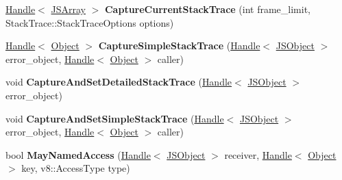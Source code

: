 \begin{DoxyCompactItemize}
\item 
\hypertarget{classv8_1_1internal_1_1_isolate_abb32dfbd23281a600e08a714c1b6e873}{}\hyperlink{classv8_1_1internal_1_1_handle}{Handle}$<$ \hyperlink{classv8_1_1internal_1_1_j_s_array}{J\+S\+Array} $>$ {\bfseries Capture\+Current\+Stack\+Trace} (int frame\+\_\+limit, Stack\+Trace\+::\+Stack\+Trace\+Options options)\label{classv8_1_1internal_1_1_isolate_abb32dfbd23281a600e08a714c1b6e873}

\item 
\hypertarget{classv8_1_1internal_1_1_isolate_a1f4a39027e00ddf0849c9c7e78663316}{}\hyperlink{classv8_1_1internal_1_1_handle}{Handle}$<$ \hyperlink{classv8_1_1internal_1_1_object}{Object} $>$ {\bfseries Capture\+Simple\+Stack\+Trace} (\hyperlink{classv8_1_1internal_1_1_handle}{Handle}$<$ \hyperlink{classv8_1_1internal_1_1_j_s_object}{J\+S\+Object} $>$ error\+\_\+object, \hyperlink{classv8_1_1internal_1_1_handle}{Handle}$<$ \hyperlink{classv8_1_1internal_1_1_object}{Object} $>$ caller)\label{classv8_1_1internal_1_1_isolate_a1f4a39027e00ddf0849c9c7e78663316}

\item 
\hypertarget{classv8_1_1internal_1_1_isolate_aa93e54d80774d9817a625e70a47e3609}{}void {\bfseries Capture\+And\+Set\+Detailed\+Stack\+Trace} (\hyperlink{classv8_1_1internal_1_1_handle}{Handle}$<$ \hyperlink{classv8_1_1internal_1_1_j_s_object}{J\+S\+Object} $>$ error\+\_\+object)\label{classv8_1_1internal_1_1_isolate_aa93e54d80774d9817a625e70a47e3609}

\item 
\hypertarget{classv8_1_1internal_1_1_isolate_a43f5575d84dd78fbbd347b3a247a616a}{}void {\bfseries Capture\+And\+Set\+Simple\+Stack\+Trace} (\hyperlink{classv8_1_1internal_1_1_handle}{Handle}$<$ \hyperlink{classv8_1_1internal_1_1_j_s_object}{J\+S\+Object} $>$ error\+\_\+object, \hyperlink{classv8_1_1internal_1_1_handle}{Handle}$<$ \hyperlink{classv8_1_1internal_1_1_object}{Object} $>$ caller)\label{classv8_1_1internal_1_1_isolate_a43f5575d84dd78fbbd347b3a247a616a}

\item 
\hypertarget{classv8_1_1internal_1_1_isolate_ad8c8c8249b02c91d6ad23ef718a4533c}{}bool {\bfseries May\+Named\+Access} (\hyperlink{classv8_1_1internal_1_1_handle}{Handle}$<$ \hyperlink{classv8_1_1internal_1_1_j_s_object}{J\+S\+Object} $>$ receiver, \hyperlink{classv8_1_1internal_1_1_handle}{Handle}$<$ \hyperlink{classv8_1_1internal_1_1_object}{Object} $>$ key, v8\+::\+Access\+Type type)\label{classv8_1_1internal_1_1_isolate_ad8c8c8249b02c91d6ad23ef718a4533c}


\end{DoxyCompactItemize}
